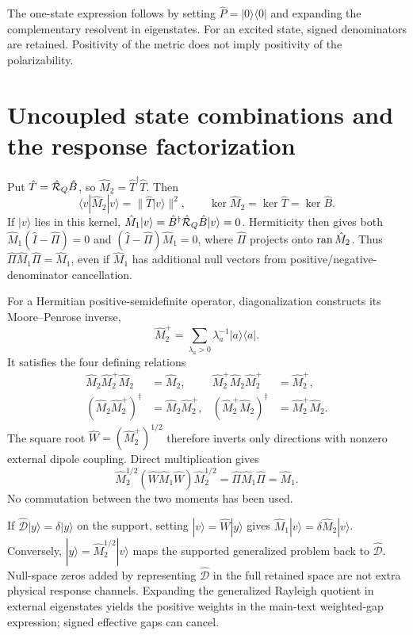 \documentclass[aip,jcp,amsmath,amssymb,preprint,floatfix]{revtex4-1}
\begin{document}
The one-state expression follows by setting $\hat{P}=|0\rangle\langle0|$ and expanding the complementary resolvent in eigenstates. For an excited state, signed denominators are retained. Positivity of the metric does not imply positivity of the polarizability.

\section{Uncoupled state combinations and the response factorization}\label{sec:support}
Put $\hat{T}=\hat{\mathcal R}_Q \hat{B}$, so $\hat{M}_2=\hat{T}^\dagger \hat{T}$. Then
\begin{equation}
\langle v|\hat{M}_2|v\rangle=\|\hat{T}|v\rangle\|^2,\qquad
\ker \hat{M}_2=\ker \hat{T}=\ker \hat{B}.
\end{equation}
If $|v\rangle$ lies in this kernel, $\hat{M}_1|v\rangle=\hat{B}^\dagger\hat{\mathcal R}_Q \hat{B}|v\rangle=0$. Hermiticity then gives both $\hat{M}_1(\hat{I}-\hat{\Pi})=0$ and $(\hat{I}-\hat{\Pi})\hat{M}_1=0$, where $\hat{\Pi}$ projects onto $\operatorname{ran} \hat{M}_2$. Thus $\hat{\Pi} \hat{M}_1\hat{\Pi}=\hat{M}_1$, even if $\hat{M}_1$ has additional null vectors from positive/negative-denominator cancellation.

For a Hermitian positive-semidefinite operator, diagonalization constructs its Moore--Penrose inverse,\cite{Penrose1955}
\begin{equation}
\hat{M}_2^+=\sum_{\lambda_a>0}\lambda_a^{-1}|a\rangle\langle a|.
\end{equation}
It satisfies the four defining relations
\begin{align}
\hat{M}_2\hat{M}_2^+\hat{M}_2&=\hat{M}_2,&\hat{M}_2^+\hat{M}_2\hat{M}_2^+&=\hat{M}_2^+,\\
(\hat{M}_2\hat{M}_2^+)^\dagger&=\hat{M}_2\hat{M}_2^+,&
(\hat{M}_2^+\hat{M}_2)^\dagger&=\hat{M}_2^+\hat{M}_2.
\end{align}
The square root $\hat{W}=(\hat{M}_2^+)^{1/2}$ therefore inverts only directions with nonzero external dipole coupling. Direct multiplication gives
\begin{equation}
\hat{M}_2^{1/2}(\hat{W}\hat{M}_1\hat{W})\hat{M}_2^{1/2}=\hat{\Pi} \hat{M}_1\hat{\Pi}=\hat{M}_1.
\end{equation}
No commutation between the two moments has been used.

If $\hat{\mathcal D}|y\rangle=\delta|y\rangle$ on the support, setting $|v\rangle=\hat{W}|y\rangle$ gives $\hat{M}_1|v\rangle=\delta\hat{M}_2|v\rangle$. Conversely, $|y\rangle=\hat{M}_2^{1/2}|v\rangle$ maps the supported generalized problem back to $\hat{\mathcal D}$. Null-space zeros added by representing $\hat{\mathcal D}$ in the full retained space are not extra physical response channels. Expanding the generalized Rayleigh quotient in external eigenstates yields the positive weights in the main-text weighted-gap expression; signed effective gaps can cancel.
\end{document}
